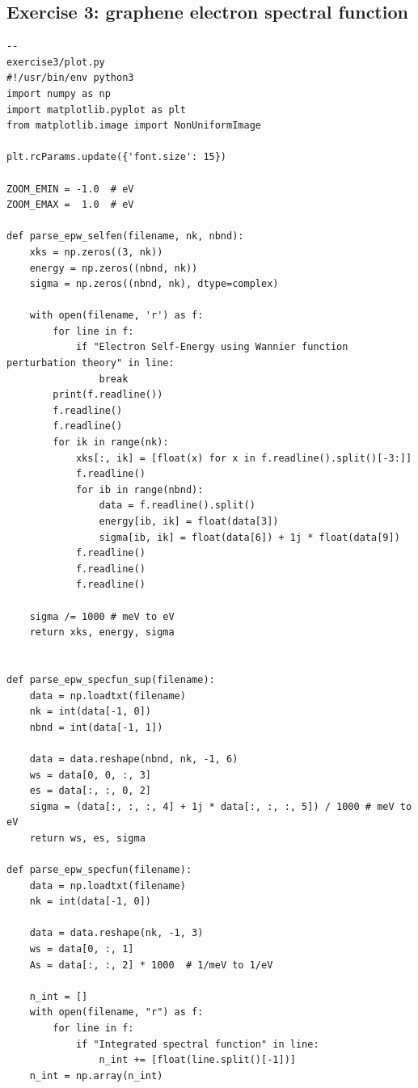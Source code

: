 \documentclass[a4paper,11pt,serif]{article}
\begin{document}
\subsection*{Exercise 3: graphene electron spectral function}
\begin{scriptsize}
 \begin{Verbatim}[frame=single]
--                                                                       exercise3/plot.py
#!/usr/bin/env python3
import numpy as np
import matplotlib.pyplot as plt
from matplotlib.image import NonUniformImage

plt.rcParams.update({'font.size': 15})

ZOOM_EMIN = -1.0  # eV
ZOOM_EMAX =  1.0  # eV

def parse_epw_selfen(filename, nk, nbnd):
    xks = np.zeros((3, nk))
    energy = np.zeros((nbnd, nk))
    sigma = np.zeros((nbnd, nk), dtype=complex)

    with open(filename, 'r') as f:
        for line in f:
            if "Electron Self-Energy using Wannier function perturbation theory" in line:
                break
        print(f.readline())
        f.readline()
        f.readline()
        for ik in range(nk):
            xks[:, ik] = [float(x) for x in f.readline().split()[-3:]]
            f.readline()
            for ib in range(nbnd):
                data = f.readline().split()
                energy[ib, ik] = float(data[3])
                sigma[ib, ik] = float(data[6]) + 1j * float(data[9])
            f.readline()
            f.readline()
            f.readline()

    sigma /= 1000 # meV to eV
    return xks, energy, sigma


def parse_epw_specfun_sup(filename):
    data = np.loadtxt(filename)
    nk = int(data[-1, 0])
    nbnd = int(data[-1, 1])

    data = data.reshape(nbnd, nk, -1, 6)
    ws = data[0, 0, :, 3]
    es = data[:, :, 0, 2]
    sigma = (data[:, :, :, 4] + 1j * data[:, :, :, 5]) / 1000 # meV to eV
    return ws, es, sigma

def parse_epw_specfun(filename):
    data = np.loadtxt(filename)
    nk = int(data[-1, 0])

    data = data.reshape(nk, -1, 3)
    ws = data[0, :, 1]
    As = data[:, :, 2] * 1000  # 1/meV to 1/eV

    n_int = []
    with open(filename, "r") as f:
        for line in f:
            if "Integrated spectral function" in line:
                n_int += [float(line.split()[-1])]
    n_int = np.array(n_int)


\end{Verbatim}
\end{scriptsize}
\end{document}
